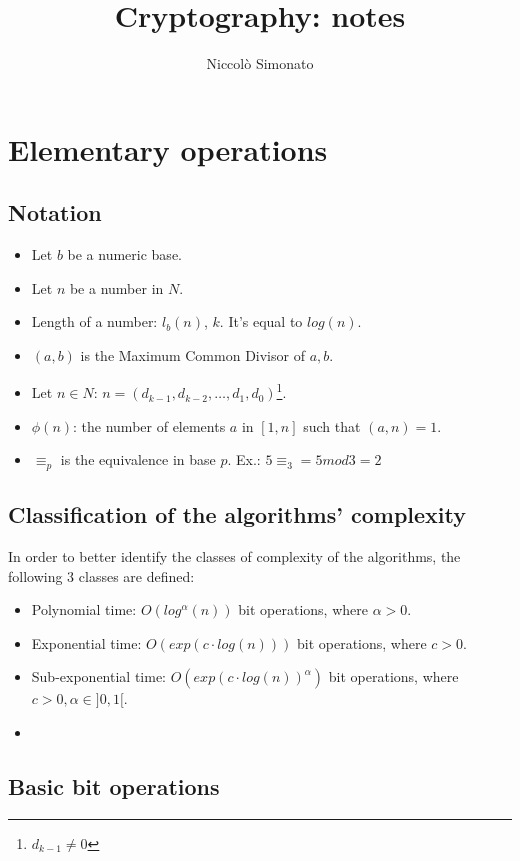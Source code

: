 \documentclass[12pt, a4paper, english]{report}
\author{Niccolò Simonato}
\title{Cryptography: notes}
\begin{document}
\maketitle

\tableofcontents

\chapter{Elementary operations}
\section{Notation}
\begin{itemize}
    \item Let $b$ be a numeric base.
    \item Let $n$ be a number in $N$.
    \item Length of a number: $l_{b}(n)$, $k$. It's equal to $log(n)$.
    \item $(a,b)$ is the Maximum Common Divisor of $a,b$.
    \item Let $n \in N$: $n = (d_{k-1}, d_{k-2}, \dots, d_{1}, d_{0})$\footnote{$d_{k-1} \neq 0$}.
    \item $\phi(n)$: the number of elements $a$ in $[1,n]$ such that $(a,n) = 1$.
    \item $\equiv_{p}$ is the equivalence in base $p$. Ex.: $5 \equiv_{3} = 5 mod 3 = 2 $
\end{itemize}


\section{Classification of the algorithms' complexity}
In order to better identify the classes of complexity of the algorithms, the following 3 classes are defined:
\begin{itemize}
    \item Polynomial time: $O(log^{\alpha}(n))$ bit operations, where $\alpha > 0$.
    \item Exponential time: $O(exp(c \cdot log(n)))$ bit operations, where $c > 0$.
    \item Sub-exponential time: $O(exp(c \cdot log(n))^{\alpha})$ bit operations, where $c > 0, \alpha \in ]0, 1[$.
\item
\end{itemize}


\section{Basic bit operations}
\end{document}
